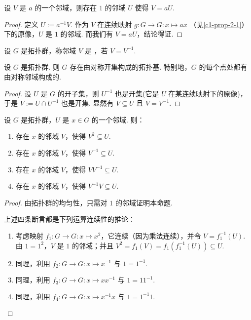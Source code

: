 \begin{proposition}\label{c1-prop-2-3}
设 $V$ 是 $a$ 的一个邻域，则存在 $1$ 的邻域 $U$ 使得 $V=aU$.
\end{proposition}

\begin{proof}
定义 $U:=a^{-1}V$. 作为 $V$ 在连续映射 $g:G\to G:x\mapsto ax$ （见\autoref{c1-prop-2-1}）下的原像，$U$ 是 $1$ 的邻域. 而我们有 $V=aU$，结论得证.
\end{proof}

\begin{definition}\label{c1-def-2-1}
设 $G$ 是拓扑群，称邻域 $V$ 是 ，若 $V=V^{-1}$.
\end{definition}

\begin{proposition}\label{c1-prop-2-4}
设 $G$ 是拓扑群. 则 $G$ 存在由对称开集构成的拓扑基. 特别地，$G$ 的每个点处都有由对称邻域构成的.
\end{proposition}

\begin{proof}
设 $U$ 是 $G$ 的开子集，则 $U^{-1}$ 也是开集(它是 $U$ 在某连续映射下的原像)，于是 $V:=U\cap U^{-1}$ 也是开集. 显然有 $V\subseteq U$ 且 $V=V^{-1}$.
\end{proof}

\begin{proposition}\label{c1-prop-2-5}
设 $G$ 是拓扑群，$U$ 是 $x\in G$ 的一个邻域. 则：
\begin{enumerate}[label=(\arabic*),leftmargin=*]
    \item 存在 $x$ 的邻域 $V$，使得 $V^{2}\subseteq U$.
    \item 存在 $x$ 的邻域 $V$，使得 $V^{-1}\subseteq U$.
    \item 存在 $x$ 的邻域 $V$，使得 $VV^{-1}\subseteq U$.
    \item 存在 $x$ 的邻域 $V$，使得 $V^{-1}V\subseteq U$.
\end{enumerate}
\end{proposition}

\begin{proof}
由拓扑群的均匀性，只需对 $1$ 的邻域证明本命题.

上述四条断言都是下列运算连续性的推论：
\begin{enumerate}[label=(\arabic*),leftmargin=*]
    \item 考虑映射 $f_{1}:G\to G:x\mapsto x^{2}$，它连续（因为乘法连续），并令 $V=f_{1}^{-1}(U)$. 由 $1=1^{2}$，$V$ 是 $1$ 的邻域；并且 $V^{2}=f_{1}(V)=f_{1}(f_{1}^{-1}(U))\subseteq U$.
    \item 同理，利用 $f_{2}:G\to G:x\mapsto x^{-1}$ 与 $1=1^{-1}$.
    \item 同理，利用 $f_{3}:G\to G:x\mapsto xx^{-1}$ 与 $1=11^{-1}$.
    \item 同理，利用 $f_{4}:G\to G:x\mapsto x^{-1}x$ 与 $1=1^{-1}1$.
\end{enumerate}
\end{proof}

